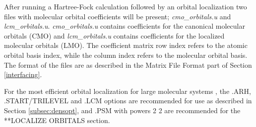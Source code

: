 After running a Hartree-Fock calculation followed by an orbital localization two files with molecular orbital coefficients will be present; \textit{cmo\_orbitals.u} and \textit{lcm\_orbitals.u}. \textit{cmo\_orbitals.u} contains coefficients for the canonical molecular orbitals (CMO) and \textit{lcm\_orbitals.u} contains coefficients for the localized molecular orbitals (LMO). The coefficient matrix row index refers to the atomic orbital basis index, while the column index refers to the molecular orbital basis. The format of the files are as described in the Matrix File Format part of Section \ref{interfacing}.  

For the most efficient orbital localization for large molecular systems \cite{hoyvik:3L}, the .ARH, .START/TRILEVEL  and .LCM options are recommended for use as described in Section \ref{subsec:densopt}, and .PSM with powers 2 2 are recommended for the **LOCALIZE ORBITALS section.  

